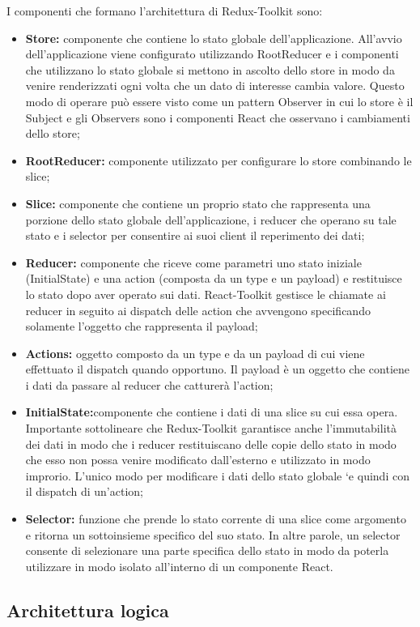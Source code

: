 I componenti che formano l’architettura di Redux-Toolkit sono:
\begin{itemize}
    \item \textbf{Store:} componente che contiene lo stato globale dell’applicazione.
    All’avvio dell’applicazione viene configurato utilizzando RootReducer e i componenti che utilizzano
    lo stato globale si mettono in ascolto dello store in modo da venire renderizzati ogni volta che un dato
    di interesse cambia valore. Questo modo di operare può essere visto come un pattern Observer in
    cui lo store è il Subject e gli Observers sono i componenti React che osservano i cambiamenti dello store;
    \item \textbf{RootReducer:} componente utilizzato per configurare lo store combinando le slice;
    \item \textbf{Slice:} componente che contiene un proprio stato che rappresenta una porzione dello stato globale
    dell’applicazione, i reducer che operano su tale stato e i selector per consentire ai suoi client il
    reperimento dei dati;
    \item \textbf{Reducer:} componente che riceve come parametri uno stato iniziale (InitialState) e una action
    (composta da un type e un payload) e restituisce lo stato dopo aver operato sui dati. 
    React-Toolkit gestisce le chiamate ai reducer in seguito ai dispatch delle action che avvengono
    specificando solamente l’oggetto che rappresenta il payload;
    \item \textbf{Actions:} oggetto composto da un type e da un payload di cui viene effettuato il dispatch quando
    opportuno. Il payload è un oggetto che contiene i dati da passare al reducer che catturerà l’action;
    \item \textbf{InitialState:}componente che contiene i dati di una slice su cui essa opera.
    Importante sottolineare che Redux-Toolkit garantisce anche l’immutabilità
    dei dati in modo che i reducer restituiscano delle copie dello stato in modo che esso non possa venire
    modificato dall’esterno e utilizzato in modo improrio.
    L’unico modo per modificare i dati dello stato globale `e quindi con il dispatch di un’action;
    \item \textbf{Selector:} funzione che prende lo stato corrente di una slice come argomento e ritorna un sottoinsieme
    specifico del suo stato. In altre parole, un selector consente di selezionare una parte specifica
    dello stato in modo da poterla utilizzare in modo isolato all’interno di un componente React.
\end{itemize}

\subsection{Architettura logica}
